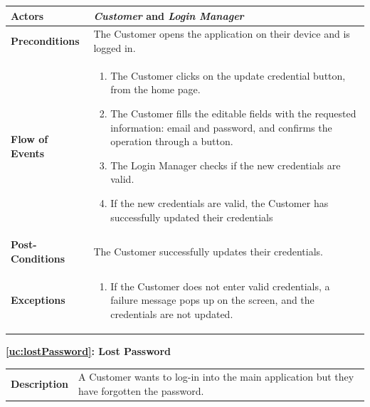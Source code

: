 \documentclass[a4paper, 12pt, oneside]{article}
\begin{document}
\begin{enumerate}[labelindent=20pt, label={UC.\arabic*}, itemindent=1em,leftmargin=!]
\begin{tabularx}{\linewidth}{| l | X |}

    \hline
    \textbf{Actors} & \textbf{\textit{Customer}} and \textit{\textbf{Login Manager}}\\
    
    \hline
    \textbf{Preconditions} & The Customer opens the application on their device and is logged in.\\
    
    \hline
    \textbf{Flow of Events} & \parbox{0.7\textwidth}{   
        \begin{enumerate}
            \item The Customer clicks on the update credential button, from the home page.
            \item The Customer fills the editable fields with the requested information: email and password, and confirms the operation through a button.
            \item The Login Manager checks if the new credentials are valid. 
            \item If the new credentials are valid, the Customer has successfully updated their credentials
    \end{enumerate}}\\
    
    \hline
    \textbf{Post-Conditions} & The Customer successfully updates their credentials.\\
    
    \hline
    \textbf{Exceptions} & \parbox{0.7\textwidth}{ \begin{enumerate}
            \item If the Customer does not enter valid credentials, a failure message pops up on the screen, and the credentials are not updated.
        \end{enumerate}}\\

    \hline
    
\end{tabularx}
\newpage
\begin{center}
{\textbf{\ref{uc:lostPassword}: Lost Password}}
\end{center}
\begin{tabularx}{\linewidth}{| l | X |}
    
    \hline
    \textbf{Description} & A Customer wants to log-in into the main application but they have forgotten the password.\\
    

\end{tabularx}
\end{enumerate}
\end{document}
